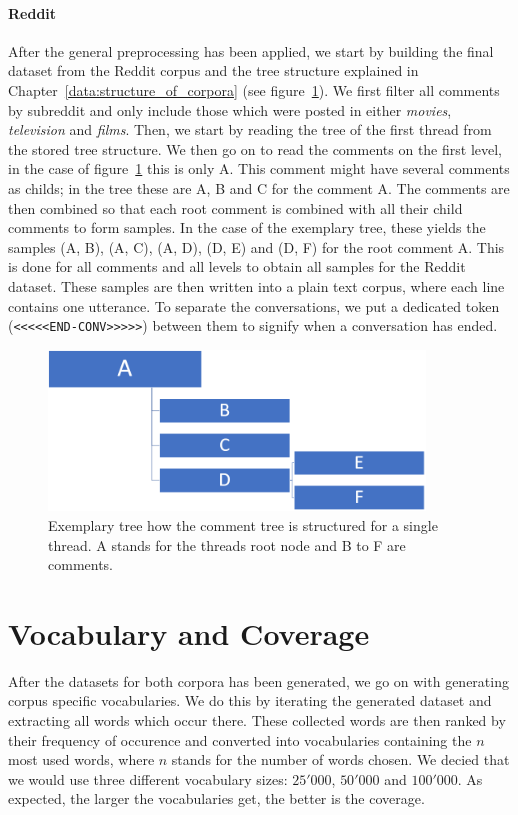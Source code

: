 \paragraph{Reddit} After the general preprocessing has been applied, we start by building the final dataset from the Reddit corpus and the tree structure explained in Chapter~\ref{data:structure_of_corpora} (see figure~\ref{fig:data:reddit:utterance:construction}). We first filter all comments by subreddit and only include those which were posted in either \emph{movies}, \emph{television} and \emph{films}. Then, we start by reading the tree of the first thread from the stored tree structure. We then go on to read the comments on the first level, in the case of figure~\ref{fig:data:reddit:utterance:construction} this is only A. This comment might have several comments as childs; in the tree these are A, B and C for the comment A. The comments are then combined so that each root comment is combined with all their child comments to form samples. In the case of the exemplary tree, these yields the samples (A, B), (A, C), (A, D), (D, E) and (D, F) for the root comment A. This is done for all comments and all levels to obtain all samples for the Reddit dataset. These samples are then written into a plain text corpus, where each line contains one utterance. To separate the conversations, we put a dedicated token (\texttt{<<<<<END-CONV>>>>>}) between them to signify when a conversation has ended.

\begin{figure}[h]
	\centering
	\includegraphics[width=10cm]{img/reddit_utterance_construction.PNG}
	\caption{Exemplary tree how the comment tree is structured for a single thread. A stands for the threads root node and B to F are comments.}
	\label{fig:data:reddit:utterance:construction}
\end{figure}

\section{Vocabulary and Coverage}
After the datasets for both corpora has been generated, we go on with generating corpus specific vocabularies. We do this by iterating the generated dataset and extracting all words which occur there. These collected words are then ranked by their frequency of occurence and converted into vocabularies containing the $n$ most used words, where $n$ stands for the number of words chosen. We decied that we would use three different vocabulary sizes: $25'000$, $50'000$ and $100'000$. As expected, the larger the vocabularies get, the better is the coverage.

